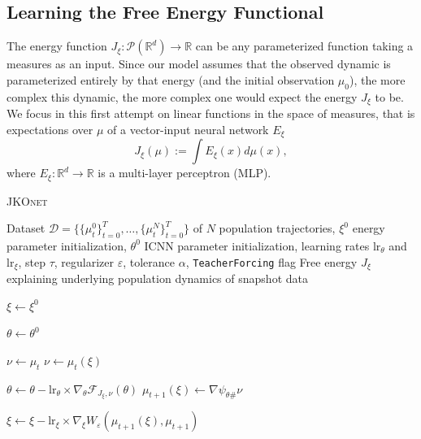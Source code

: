 \subsection{Learning the Free Energy Functional}  \label{sec:learn_energy}
The energy function $J_\xi : \mathcal{P}(\mathbb{R}^d) \rightarrow \mathbb{R}$ can be any parameterized function taking a measures as an input. 
Since our model assumes that the observed dynamic is parameterized entirely by that energy (and the initial observation $\mu_0$), the more complex this dynamic, the more complex one would expect the energy $J_\xi$ to be. We focus in this first attempt on linear functions in the space of measures, that is expectations over $\mu$ of a vector-input neural network $E_\xi$
\begin{equation} \label{eq:energy}
    J_\xi(\mu) := \int E_\xi(x) d\mu(x),
\end{equation}
where $E_\xi:\mathbb{R}^d \rightarrow \mathbb{R}$ is a multi-layer perceptron (MLP).


\begin{algorithm}[t]
\caption{\textsc{JKOnet}}
\label{algo:jkonet}
\begin{algorithmic}


    Dataset $\mathcal{D}=\{\{\mu_t^0 \}_{t=0}^T, \ldots, \{\mu_t^N \}_{t=0}^T\}$ of $N$ population trajectories, $\xi^0$ energy parameter initialization, $\theta^0$ ICNN parameter initialization, learning rates $\text{lr}_\theta$ and $\text{lr}_\xi$, step $\tau$, regularizer $\varepsilon$, tolerance $\alpha$, {\texttt{TeacherForcing}} flag
    Free energy $J_{\xi}$ explaining underlying population dynamics of snapshot data
   \smallskip
   
   \STATE $\xi\leftarrow \xi^0$

   \STATE $\theta\leftarrow \theta^0$

    \STATE $\nu \leftarrow \mu_t$
   \ELSE
   \STATE $\nu \leftarrow \mu_t(\xi)$
   \ENDIF
    
   \STATE $\theta \leftarrow \theta - \text{lr}_\theta \times \nabla_\theta \mathcal{F}_{J_\xi,\nu}(\theta)$
   \ENDWHILE
   \STATE $\mu_{t+1}(\xi) \leftarrow \nabla \psi_{\theta \#} \nu$

   \STATE $\xi \leftarrow \xi - \text{lr}_\xi \times \nabla_\xi W_\varepsilon(\mu_{t+1}(\xi), \mu_{t+1})$
   \ENDFOR
   \ENDFOR
	
\end{algorithmic}
\end{algorithm}


